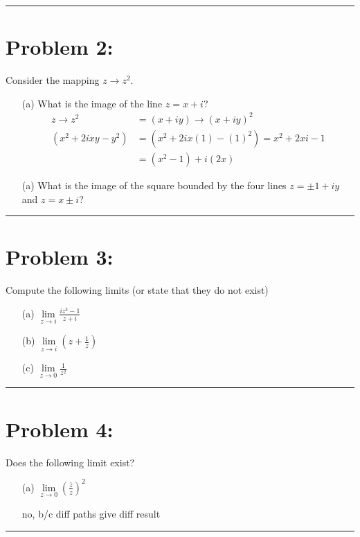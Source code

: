 \documentclass{article}
\begin{document}
\vspace{1cm}
\hrule %

\newpage
\section*{Problem 2:}
Consider the mapping $z \xrightarrow{} z^2$.
\begin{enumerate}
\item[(a)] What is the image of the line $z  = x + i$?
  \begin{align*}
    z \xrightarrow{} z^2  &= (x+iy) \xrightarrow{} (x+iy)^2\\
    (x^2+2ixy-y^2) &= (x^2+2ix(1)-(1)^2) = x^2 + 2xi - 1 \\
    &= (x^2-1) + i(2x)   
  \end{align*}
\item[(a)] What is the image of the square bounded by the four lines $z  = \pm 1 + iy$ and $z = x \pm i$?  
\end{enumerate}

\vspace{1cm} %

\hrule

\newpage
\section*{Problem 3:}
Compute the following limits (or state that they do not exist)
\begin{enumerate}
  \item[(a)] $\lim\limits_{z \to i} \frac{iz^3 - 1}{z + i}$
  \item[(b)] $\lim\limits_{z \to i}\left(z + \frac{1}{z}\right)$
  \item[(c)] $\lim\limits_{z \to 0}\frac{1}{z^2}$
\end{enumerate}
\vspace{1cm} %

\hrule

\newpage
\section*{Problem 4: }
Does the following limit exist?
\begin{enumerate}
\item[(a)] $\lim\limits_{z \to 0} \left(\frac{\bar{z}}{z}\right)^2$

  no, b/c diff paths give diff result
\end{enumerate}
\hrule
\end{document}

